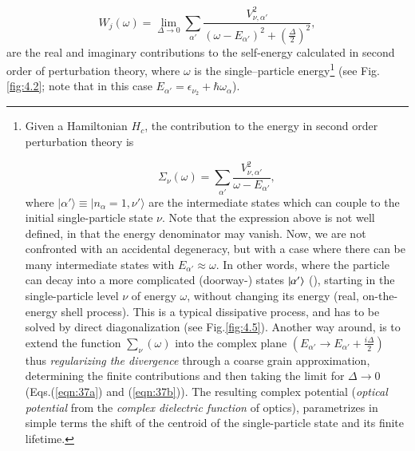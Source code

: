 \begin{equation}
W_j(\omega)  = \lim_{\Delta \rightarrow 0} \sum_{\alpha'} \frac{V_{\nu ,\alpha'}^2}{(\omega -E_{\alpha'})^2 + (\frac{\Delta}{2})^2},
\label{eqn:37b}
\end{equation}
are the real and imaginary contributions to the self-energy calculated in second order of perturbation theory, where $\omega$ is the single--particle energy\footnote{Given a Hamiltonian $H_{c}$, the contribution to the energy in second order perturbation theory is

{\protect
\begin{equation}
\nonumber\Sigma_{\nu}(\omega) = \sum_{\alpha'} \frac{V_{\nu ,\alpha'}^2}{\omega - E_{\alpha'}} ,
\label{eqn:37c}
\end{equation}
}
where $|\alpha' \rangle \equiv |n_{\alpha}=1,\nu' \rangle$ are the intermediate states which can couple to the initial single-particle state $\nu$. Note that the expression above is not well defined, in that the energy denominator may vanish. Now, we are not confronted with an accidental degeneracy, but with a   case where there can be many intermediate states with $E_{\alpha'} \approx \omega$. In other words, where the particle can decay into a more complicated (doorway-) states $|{\alpha'} \rangle$  (\cite{Feshbach:58}), starting in the single-particle level $\nu$ of energy $\omega$, without changing its energy (real, on-the-energy shell process). This is a typical dissipative  process, and has to be solved by direct diagonalization (see Fig.\ref{fig:4.5}). Another way around, is to extend the function $\sum_{\nu}(\omega)$ into the complex plane $(E_{\alpha'} \rightarrow E_{\alpha'} + \frac{i\Delta}{2})$ thus {\it regularizing the divergence} through a coarse grain approximation, determining the finite contributions and then taking the limit for $\Delta \rightarrow 0$ (Eqs.(\ref{eqn:37a}) and (\ref{eqn:37b})). The resulting complex potential ({\it optical potential} from the {\it complex dielectric function} of optics), parametrizes in simple terms the shift of the centroid of the single-particle state and its finite lifetime.} (see Fig. \ref{fig:4.2}; note that in this case $E_{\alpha'}=\epsilon_{\nu_2}+\hbar\omega_\alpha$).


